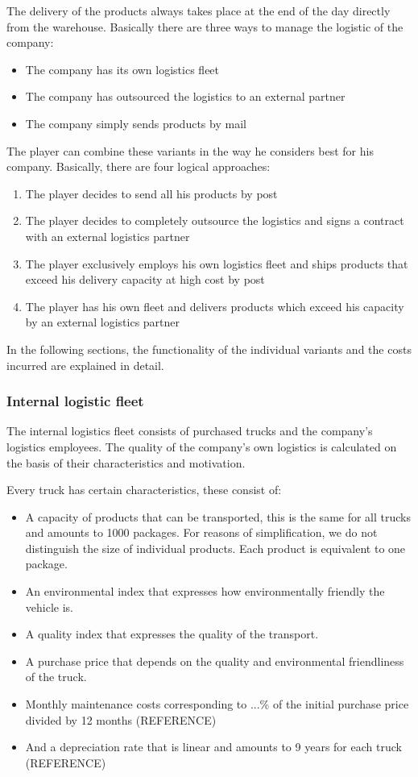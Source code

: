 The delivery of the products always takes place at the end of the day directly from the warehouse. Basically there are three ways to manage the logistic of the company: 
\begin{itemize}
    \item The company has its own logistics fleet
    \item The company has outsourced the logistics to an external partner
    \item The company simply sends products by mail
\end{itemize}

The player can combine these variants in the way he considers best for his company.  Basically, there are four logical approaches:
\begin{enumerate}
    \item The player decides to send all his products by post 
    \item The player decides to completely outsource the logistics and signs a contract with an external logistics partner
    \item The player exclusively employs his own logistics fleet and ships products that exceed his delivery capacity at high cost by post
    \item The player has his own fleet and delivers products which exceed his capacity by an external logistics partner
\end{enumerate}
	
In the following sections, the functionality of the individual variants and the costs incurred are explained in detail.

\subsubsection{Internal logistic fleet}
The internal logistics fleet consists of purchased trucks and the company's logistics employees. The quality of the company's own logistics is calculated on the basis of their characteristics and motivation.

Every truck has certain characteristics, these consist of:
\begin{itemize}
    \item A capacity of products that can be transported, this is the same for all trucks and amounts to 1000 packages. For reasons of simplification, we do not distinguish the size of individual products.  Each product is equivalent to one package. 
    \item An environmental index that expresses how environmentally friendly the vehicle is.
    \item A quality index that expresses the quality of the transport.
    \item A purchase price that depends on the quality and environmental friendliness of the truck.
    \item Monthly maintenance costs corresponding to ...\% of the initial purchase price divided by 12 months (REFERENCE)
    \item And a depreciation rate that is linear and amounts to 9 years for each truck (REFERENCE) 
\end{itemize}

